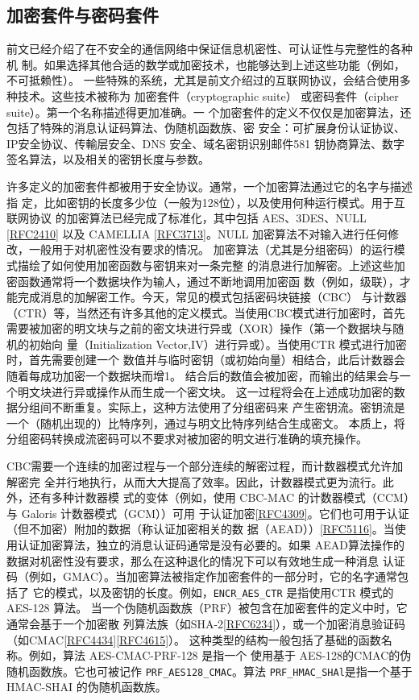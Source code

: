 \subsection{加密套件与密码套件}
前文已经介绍了在不安全的通信网络中保证信息机密性、可认证性与完整性的各种机
制。如果选择其他合适的数学或加密技术，也能够达到上述这些功能（例如，不可抵赖性）。
一些特殊的系统，尤其是前文介绍过的互联网协议，会结合使用多种技术。这些技术被称为
加密套件（cryptographic suite） 或密码套件（cipher suite）。第一个名称描述得更加准确。一
个加密套件的定义不仅仅是加密算法，还包括了特殊的消息认证码算法、伪随机函数族、密
安全：可扩展身份认证协议、IP安全协议、传輸层安全、DNS 安全、域名密钥识别邮件581
钥协商算法、数字签名算法，以及相关的密钥长度与参数。

许多定义的加密套件都被用于安全协议。通常，一个加密算法通过它的名字与描述指
定，比如密钥的长度多少位（一般为128位），以及使用何种运行模式。用于互联网协议
的加密算法已经完成了标准化，其中包括 AES、3DES、NULL \href{https://www.rfc-editor.org/rfc/rfc2410}{[RFC2410]} 以及 CAMELLIA
\href{https://www.rfc-editor.org/rfc/rfc3713}{[RFC3713]}。NULL 加密算法不对输入进行任何修改，一般用于对机密性没有要求的情况。
加密算法（尤其是分组密码）的运行模式描绘了如何使用加密函数与密钥来对一条完整
的消息进行加解密。上述这些加密函数通常将一个数据块作为输人，通过不断地调用加密函
数（例如，级联），才能完成消息的加解密工作。今天，常见的模式包括密码块链接（CBC）
与计数器（CTR）等，当然还有许多其他的定义模式。当使用CBC模式进行加密时，首先
需要被加密的明文块与之前的密文块进行异或（XOR）操作（第一个数据块与随机的初始向
量（Initialization Vector,IV）进行异或）。当使用CTR 模式进行加密时，首先需要创建一个
数值并与临时密钥（或初始向量）相结合，此后计数器会随着每成功加密一个数据块而增1。
结合后的数值会被加密，而输出的结果会与一个明文块进行异或操作从而生成一个密文块。
这一过程将会在上述成功加密的数据分组间不断重复。实际上，这种方法使用了分组密码来
产生密钥流。密钥流是一个（随机出现的）比特序列，通过与明文比特序列结合生成密文。
本质上，将分组密码转换成流密码可以不要求对被加密的明文进行准确的填充操作。

CBC需要一个连续的加密过程与一个部分连续的解密过程，而计数器模式允许加解密完
全并行地执行，从而大大提高了效率。因此，计数器模式更为流行。此外，还有多种计数器模
式的变体（例如，使用 CBC-MAC 的计数器模式（CCM）与 Galoris 计数器模式（GCM））可用
于认证加密\href{https://www.rfc-editor.org/rfc/rfc4309}{[RFC4309]}。它们也可用于认证（但不加密）附加的数据（称认证加密相关的数
据（AEAD））\href{https://www.rfc-editor.org/rfc/rfc5116}{[RFC5116]}。当使用认证加密算法，独立的消息认证码通常是没有必要的。如果
AEAD算法操作的数据对机密性没有要求，那么在这种退化的情况下可以有效地生成一种消息
认证码（例如，GMAC）。当加密算法被指定作加密套件的一部分时，它的名字通常包括了
它的模式，以及密钥的长度。例如，\verb|ENCR_AES_CTR| 是指使用CTR 模式的AES-128 算法。
当一个伪随机函数族（PRF）被包含在加密套件的定义中时，它通常会基于一个加密散
列算法族（如SHA-2\href{https://www.rfc-editor.org/rfc/rfc6234}{[RFC6234]}），或一个加密消息验证码（如CMAC\href{https://www.rfc-editor.org/rfc/rfc4434}{[RFC4434]}\href{https://www.rfc-editor.org/rfc/rfc4615}{[RFC4615]}）。
这种类型的结构一般包括了基础的函数名称。例如，算法 AES-CMAC-PRF-128 是指一个
使用基于 AES-128的CMAC的伪随机函数族。它也可被记作 \verb|PRF_AES128_CMAC|。算法
\verb|PRF_HMAC_SHAl|是指一个基于 HMAC-SHAI 的伪随机函数族。


